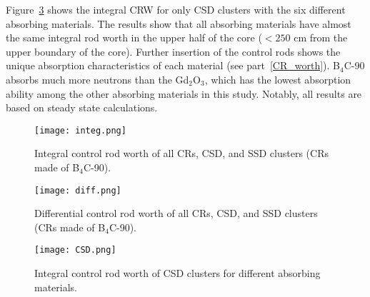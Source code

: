 Figure~\ref{fig:CSD} shows the integral CRW for only CSD clusters with the six 
different absorbing materials. The results show that all absorbing materials 
have almost the same integral rod worth in the upper half of the core 
($<250$ cm from the upper boundary of the core). Further insertion of the 
control rods shows the unique absorption characteristics of each material (see 
part~\ref{CR_worth}). B$_4$C-90 absorbs much more neutrons than the 
Gd$_2$O$_3$, which has the lowest absorption ability among the other absorbing 
materials in this study. Notably, all results are based on steady state calculations. 

\begin{figure}
	\centering
	\texttt{[image: integ.png]}
	\vspace{-0.5in}
	\caption{Integral control rod worth of all CRs, CSD, and SSD clusters (CRs made of B$_4$C-90).} 
	\label{fig:integ}
\end{figure}
\begin{figure}
	\centering
	\texttt{[image: diff.png]}
	\vspace{-0.5in}
	\caption{Differential control rod worth of all CRs, CSD, and SSD clusters (CRs made of B$_4$C-90).} 
	\label{fig:diff}
\end{figure}
\begin{figure}
	\centering
	\texttt{[image: CSD.png]}
	\vspace{-0.5in}
	\caption{Integral control rod worth of CSD clusters for different absorbing materials.} 
	\label{fig:CSD}
\end{figure}